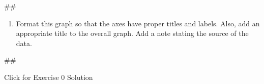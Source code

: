 \documentclass[
]{book}
\newenvironment{Shaded}{\begin{snugshade}}{\end{snugshade}}
\newcommand{\NormalTok}[1]{#1}
\providecommand{\tightlist}{%
  \setlength{\itemsep}{0pt}\setlength{\parskip}{0pt}}
\begin{document}
\begin{Shaded}
\begin{Highlighting}[]
\NormalTok{\#\#}
\end{Highlighting}
\end{Shaded}

\begin{enumerate}
\def\labelenumi{\arabic{enumi}.}
\setcounter{enumi}{7}
\tightlist
\item
  Format this graph so that the axes have proper titles and labels. Also, add an appropriate title to the overall graph. Add a note stating the source of the data.
\end{enumerate}

\begin{Shaded}
\begin{Highlighting}[]
\NormalTok{\#\#}
\end{Highlighting}
\end{Shaded}

{Click for Exercise 0 Solution}
\end{document}
